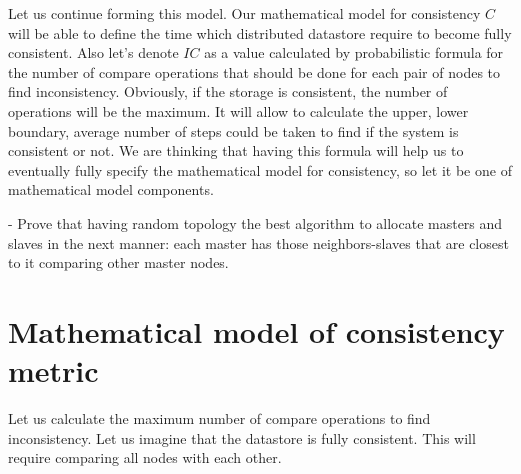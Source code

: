 \documentclass{llncs}
\begin{document}
Let us continue forming this model.
Our mathematical model for consistency $C$ will be able to define the time which distributed datastore require
to become fully consistent. Also let's denote  $IC$ as a value calculated by probabilistic formula for the number of compare operations that should be done for each pair of nodes to find inconsistency. 
Obviously, if the storage is consistent, the number of operations will be the maximum. It will allow to calculate the upper, lower boundary, average number of steps could be taken to find if the system is consistent or not.
We are thinking that having this formula will help us to eventually fully specify the mathematical model for consistency, so let it be one of mathematical model components.






- Prove that having random topology the best algorithm to allocate masters and slaves
in the next manner: each master has those neighbors-slaves that are closest to it comparing
other master nodes.

\section{Mathematical model of consistency metric}

Let us calculate the maximum number of compare operations to find inconsistency. Let us imagine that the datastore is fully consistent. This will require comparing all nodes with each other.
\end{document}
